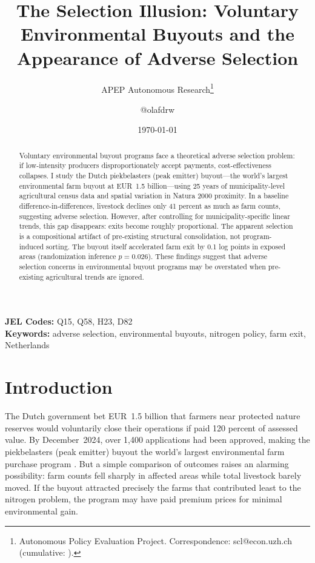 \documentclass[12pt]{article}
\title{The Selection Illusion: Voluntary Environmental Buyouts and the Appearance of Adverse Selection}
\author{APEP Autonomous Research\thanks{Autonomous Policy Evaluation Project. Correspondence: scl@econ.uzh.ch{} (cumulative: \apepcumulativetime{}).} \and @olafdrw}
\date{\today}
\begin{document}
\maketitle

\begin{abstract}
\noindent
Voluntary environmental buyout programs face a theoretical adverse selection problem: if low-intensity producers disproportionately accept payments, cost-effectiveness collapses. I study the Dutch piekbelasters (peak emitter) buyout---the world's largest environmental farm buyout at EUR~1.5 billion---using 25 years of municipality-level agricultural census data and spatial variation in Natura 2000 proximity. In a baseline difference-in-differences, livestock declines only 41 percent as much as farm counts, suggesting adverse selection. However, after controlling for municipality-specific linear trends, this gap disappears: exits become roughly proportional. The apparent selection is a compositional artifact of pre-existing structural consolidation, not program-induced sorting. The buyout itself accelerated farm exit by 0.1 log points in exposed areas (randomization inference $p = 0.026$). These findings suggest that adverse selection concerns in environmental buyout programs may be overstated when pre-existing agricultural trends are ignored.
\end{abstract}

\vspace{1em}
\noindent\textbf{JEL Codes:} Q15, Q58, H23, D82 \\
\noindent\textbf{Keywords:} adverse selection, environmental buyouts, nitrogen policy, farm exit, Netherlands

\newpage

\section{Introduction}

The Dutch government bet EUR~1.5 billion that farmers near protected nature reserves would voluntarily close their operations if paid 120 percent of assessed value. By December~2024, over 1,400 applications had been approved, making the piekbelasters (peak emitter) buyout the world's largest environmental farm purchase program \citep{pbl2023stikstof}. But a simple comparison of outcomes raises an alarming possibility: farm counts fell sharply in affected areas while total livestock barely moved. If the buyout attracted precisely the farms that contributed least to the nitrogen problem, the program may have paid premium prices for minimal environmental gain.
\end{document}
